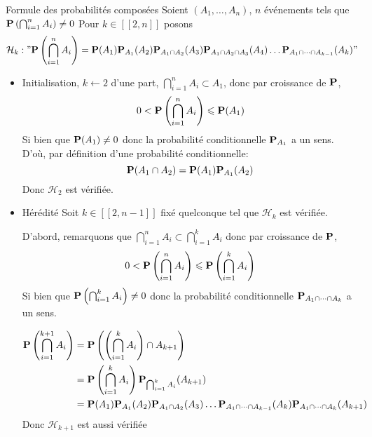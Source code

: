 \documentclass{article}
\renewenvironment{question_kholle}[2][ ]
{
	\subsection{\texorpdfstring{#2}{}}
	\notblank{#1}
	{
		\noindent #1
		\bigbreak
	}
	{}
	\begin{proof}
}
{
	\end{proof}
}
\begin{document}
\begin{question_kholle}{Formule des probabilités composées}
	Soient $(A_{1}, \dots, A_{n})$, $n$ événements tels que $\mathbf P\left( \bigcap_{i=1}^{n} A_{i} \right) \neq 0$
	Pour $k \in [ \! [ 2, n ] \!]$ posons 
	$$\mathcal{H}_{k} : " \mathbf P\left( \bigcap_{i=1}^{n}A_{i} \right) = \mathbf P(A_{1})\mathbf P_{A_{1}}(A_{2})\mathbf P_{A_{1} \cap A_{2}}(A_{3})\mathbf P_{A_{1} \cap A_{2} \cap A_{3}}(A_{4})\dots \mathbf P_{A_{1} \cap\dots \cap A_{k-1}}(A_{k})"$$
	\begin{itemize}[label=$\star$]
		
		
		\item Initialisation, $k \leftarrow 2$
		d'une part, $\bigcap_{i=1}^{n}A_{i} \subset A_{1}$, donc par croissance de $\mathbf P$, $$0<\mathbf P\left( \bigcap_{i=1}^{n}A_{i} \right) \leqslant \mathbf P(A_{1})$$
		Si bien que $\mathbf P(A_{1}) \neq 0$ donc la probabilité conditionnelle $\mathbf P_{A_{1}}$ a un sens.
		D'où, par définition d'une probabilité conditionnelle:
		$$\mathbf P(A_{1} \cap A_{2}) = \mathbf P(A_{1}) \mathbf P_{A_{1}}(A_{2})$$
		Donc $\mathcal{H}_{2}$ est vérifiée.
		
		\item Hérédité Soit $k \in [ \! [ 2, n - 1] \!]$ fixé quelconque tel que $\mathcal{H}_{k}$ est vérifiée.
		
		D'abord, remarquons que $\bigcap_{i=1}^{n}A_{i} \subset \bigcap_{i=1}^{k}A_{i}$ donc par croissance de $\mathbf P$,
		$$0 < \mathbf P\left( \bigcap_{i=1}^{n}A_{i} \right)\leqslant \mathbf P\left( \bigcap_{i=1}^{k}A_{i} \right)$$
		Si bien que $\mathbf P\left( \bigcap_{i=1}^{k} A_{i} \right) \neq 0$ donc la probabilité conditionnelle $\mathbf P_{A_{1}\cap\dots \cap A_{k}}$  a un sens.
		
		
		\begin{align*}
			\mathbf P\left( \bigcap_{i=1}^{k+1}A_{i} \right) 
			&= \mathbf P\left( \left( \bigcap_{i=1}^{k}A_{i} \right) \cap A_{k+1} \right) \\
			&= \mathbf P\left( \bigcap_{i=1}^{k}A_{i} \right)\mathbf P_{\bigcap _{i=1}^{k}A_{i}}(A_{k+1}) \\
			&= \mathbf P(A_{1})\mathbf P_{A_{1}}(A_{2})\mathbf P_{A_{1}\cap A_{2}}(A_{3})\dots \mathbf P_{A_{1} \cap \dots \cap A_{k-1}}(A_{k}) \mathbf P_{A_{1} \cap \dots \cap A_{k}}(A_{k+1})
		\end{align*}
		Donc $\mathcal{H}_{k+1}$ est aussi vérifiée
	\end{itemize}
\end{question_kholle}
\end{document}

